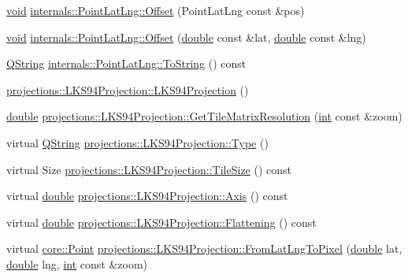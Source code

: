 \begin{DoxyCompactItemize}
\item 
\hyperlink{group___u_a_v_objects_plugin_ga444cf2ff3f0ecbe028adce838d373f5c}{void} \hyperlink{group___o_p_map_widget_ga3ad4201693b6e3add6b7ad1b9ff2e473}{internals\-::\-Point\-Lat\-Lng\-::\-Offset} (Point\-Lat\-Lng const \&pos)
\item 
\hyperlink{group___u_a_v_objects_plugin_ga444cf2ff3f0ecbe028adce838d373f5c}{void} \hyperlink{group___o_p_map_widget_ga41a2477cd6dbc4af991b30ddc2fc03c2}{internals\-::\-Point\-Lat\-Lng\-::\-Offset} (\hyperlink{_super_l_u_support_8h_a8956b2b9f49bf918deed98379d159ca7}{double} const \&lat, \hyperlink{_super_l_u_support_8h_a8956b2b9f49bf918deed98379d159ca7}{double} const \&lng)
\item 
\hyperlink{group___u_a_v_objects_plugin_gab9d252f49c333c94a72f97ce3105a32d}{Q\-String} \hyperlink{group___o_p_map_widget_gad6aaf34436258a8288cae1d93e13ad07}{internals\-::\-Point\-Lat\-Lng\-::\-To\-String} () const 
\item 
\hyperlink{group___o_p_map_widget_gacf511403f6a470bec942524c0e020b77}{projections\-::\-L\-K\-S94\-Projection\-::\-L\-K\-S94\-Projection} ()
\item 
\hyperlink{_super_l_u_support_8h_a8956b2b9f49bf918deed98379d159ca7}{double} \hyperlink{group___o_p_map_widget_gade26ff9888d408a201247708930b7def}{projections\-::\-L\-K\-S94\-Projection\-::\-Get\-Tile\-Matrix\-Resolution} (\hyperlink{ioapi_8h_a787fa3cf048117ba7123753c1e74fcd6}{int} const \&zoom)
\item 
virtual \hyperlink{group___u_a_v_objects_plugin_gab9d252f49c333c94a72f97ce3105a32d}{Q\-String} \hyperlink{group___o_p_map_widget_gae82b8ae052c2f26ea3a4c22e5874555a}{projections\-::\-L\-K\-S94\-Projection\-::\-Type} ()
\item 
virtual Size \hyperlink{group___o_p_map_widget_ga86aa23efcf539805fb69e9ce24d807ec}{projections\-::\-L\-K\-S94\-Projection\-::\-Tile\-Size} () const 
\item 
virtual \hyperlink{_super_l_u_support_8h_a8956b2b9f49bf918deed98379d159ca7}{double} \hyperlink{group___o_p_map_widget_gac4b990882512cc86ba637b3800236a67}{projections\-::\-L\-K\-S94\-Projection\-::\-Axis} () const 
\item 
virtual \hyperlink{_super_l_u_support_8h_a8956b2b9f49bf918deed98379d159ca7}{double} \hyperlink{group___o_p_map_widget_ga16c229c3db71de0b79d22b6101b21d2d}{projections\-::\-L\-K\-S94\-Projection\-::\-Flattening} () const 
\item 
virtual \hyperlink{structcore_1_1_point}{core\-::\-Point} \hyperlink{group___o_p_map_widget_gadd46e502fee5270e191688b136e895c9}{projections\-::\-L\-K\-S94\-Projection\-::\-From\-Lat\-Lng\-To\-Pixel} (\hyperlink{_super_l_u_support_8h_a8956b2b9f49bf918deed98379d159ca7}{double} lat, \hyperlink{_super_l_u_support_8h_a8956b2b9f49bf918deed98379d159ca7}{double} lng, \hyperlink{ioapi_8h_a787fa3cf048117ba7123753c1e74fcd6}{int} const \&zoom)

\end{DoxyCompactItemize}
